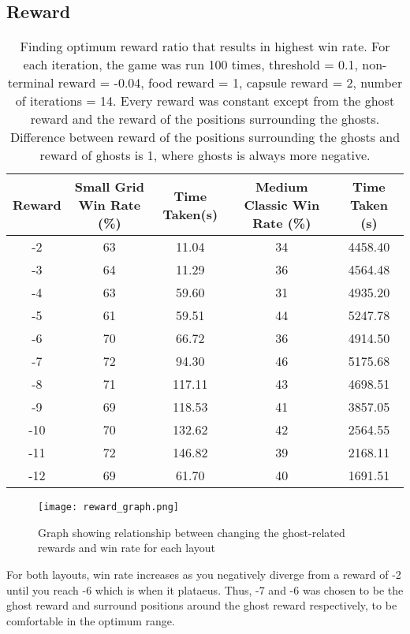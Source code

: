 \documentclass[12pt]{report}
\begin{document}
      \subsection*{Reward}
        \begin{table}[H]
          \begin{center}
            \begin{adjustbox}{max width=\textwidth}
              \begin{tabular}{*{5}{c}}

                \textbf{Reward} & \textbf{Small Grid Win Rate (\%)} & \textbf{Time Taken(s)} & \textbf{Medium Classic Win Rate (\%)} & \textbf{Time Taken (s)}\\
                \hline
                -2 & 63 & 11.04 & 34 & 4458.40\\
                -3 & 64 & 11.29 & 36 & 4564.48\\
                -4 & 63 & 59.60 & 31 & 4935.20\\
                -5 & 61 & 59.51 & 44 & 5247.78\\
                -6 & 70 & 66.72 & 36 & 4914.50\\
                -7 & 72 & 94.30 & 46 & 5175.68\\
                -8 & 71 & 117.11 & 43 & 4698.51\\
                -9 & 69 & 118.53 & 41 & 3857.05\\
                -10 & 70 & 132.62 & 42 & 2564.55\\
                -11 & 72 & 146.82 & 39 & 2168.11\\
                -12 & 69 & 61.70 & 40 & 1691.51\\
              \end{tabular}
            \end{adjustbox}
            \caption{Finding optimum reward ratio that results in highest win rate. For each iteration, the game was run 100 times, threshold = 0.1, non-terminal reward = -0.04, food reward = 1, capsule reward = 2, number of iterations = 14. Every reward was constant except from the ghost reward and the reward of the positions surrounding the ghosts. Difference between reward of the positions surrounding the ghosts and reward of ghosts is 1, where ghosts is always more negative.}
              \label{tab:table4}
        \end{center}
      \end{table}
      \vspace{-12mm}
      \begin{figure}[H]
        \centering
        \texttt{[image: reward\_graph.png]}
        \caption{Graph showing relationship between changing the ghost-related rewards and win rate for each layout}
      \end{figure}
      For both layouts, win rate increases as you negatively diverge from a reward of -2 until you reach -6 which is when it plataeus. Thus, -7 and -6 was chosen to be the ghost reward and surround positions around the ghost reward respectively, to be comfortable in the optimum range.
\end{document}
